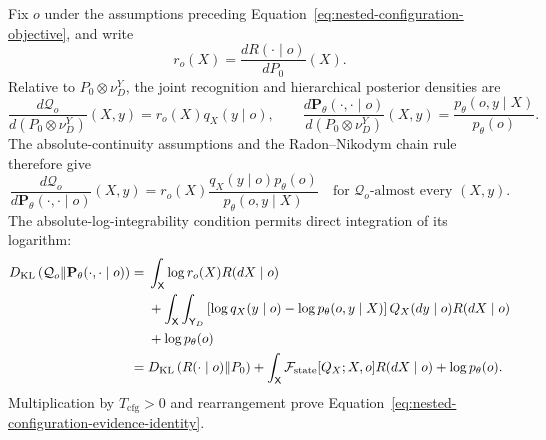 Fix \(o\) under the assumptions preceding Equation~\eqref{eq:nested-configuration-objective}, and write
\begin{equation}
r_o(X)
=\frac{dR(\mathord\cdot\mid o)}{dP_0}(X).
\label{eq:appendix-configuration-radon-nikodym-density}
\end{equation}
Relative to \(P_0\otimes\nu_D^Y\), the joint recognition and hierarchical posterior densities are
\begin{equation}
\frac{d\mathcal Q_o}{d(P_0\otimes\nu_D^Y)}(X,y)
=r_o(X)q_X(y\mid o),
\qquad
\frac{d\mathbf P_\theta(\mathord\cdot,\mathord\cdot\mid o)}
{d(P_0\otimes\nu_D^Y)}(X,y)
=\frac{p_\theta(o,y\mid X)}{p_\theta(o)}.
\label{eq:appendix-hierarchical-densities}
\end{equation}
The absolute-continuity assumptions and the Radon--Nikodym chain rule therefore give
\begin{equation}
\frac{d\mathcal Q_o}
{d\mathbf P_\theta(\mathord\cdot,\mathord\cdot\mid o)}(X,y)
=r_o(X)
\frac{q_X(y\mid o)p_\theta(o)}
{p_\theta(o,y\mid X)}
\quad
\text{for \(\mathcal Q_o\)-almost every \((X,y)\)}.
\label{eq:appendix-hierarchical-radon-nikodym-ratio}
\end{equation}
The absolute-log-integrability condition permits direct integration of its logarithm:
\begin{align}
D_{\mathrm{KL}}\left(
\mathcal Q_o
\middle\Vert
\mathbf P_\theta(\mathord\cdot,\mathord\cdot\mid o)
\right)
={}&
\int_{\mathsf X}\log r_o(X)R(dX\mid o)
\notag\\
&+\int_{\mathsf X}\int_{\mathsf Y_D}
\left[
\log q_X(y\mid o)-\log p_\theta(o,y\mid X)
\right]
Q_X(dy\mid o)R(dX\mid o)
\notag\\
&+\log p_\theta(o)
\label{eq:appendix-hierarchical-kl-expansion}\\
={}&
D_{\mathrm{KL}}\left(R(\mathord\cdot\mid o)\middle\Vert P_0\right)
+\int_{\mathsf X}
\mathcal F_{\mathrm{state}}[Q_X;X,o]R(dX\mid o)
+\log p_\theta(o).
\notag
\end{align}
Multiplication by \(T_{\mathrm{cfg}}>0\) and rearrangement prove Equation~\eqref{eq:nested-configuration-evidence-identity}.

